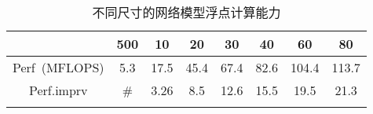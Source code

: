 \begin{center}
\begin{table}
	\caption{不同尺寸的网络模型浮点计算能力}
	\renewcommand\arraystretch{1.2}
	\begin{tabular}{cccccccc}
	\toprule
		 				&		500		&	10		&	20		&	30		&	40		&	60		&	80		\\	\midrule
		Perf~(MFLOPS)	&		5.3		&	17.5	&	45.4	&	67.4	&	82.6	&	104.4	&	113.7	\\	\hline
		Perf.imprv		&		\#		&	3.26	&	8.5		&	12.6	&	15.5	&	19.5	&	21.3	\\
	\bottomrule
	\label{tab:flops}
	\end{tabular}
\end{table}
\vspace{-3em}
\end{center}

